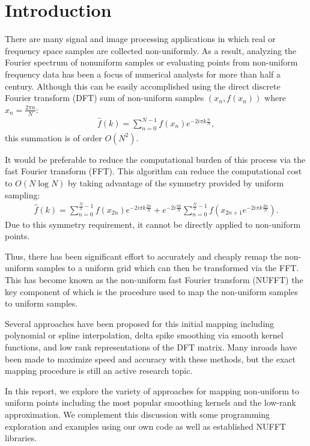


\section{Introduction}

There are many signal and image processing applications in which real or frequency space samples are collected non-uniformly.
As a result, analyzing the Fourier spectrum of nonuniform samples or evaluating points from non-uniform frequency data has been a focus of numerical analysts for more than half a century. %
Although this can be easily accomplished using the direct discrete Fourier transform (DFT) sum of non-uniform samples $(x_n, f(x_n))$ where $x_n = \frac{2\pi n}{N}$:
\begin{align*}
  \hat{f}(k) = \sum_{n=0}^{N-1} f(x_n) e^{-2i \pi k \frac{n}{N}}
,\end{align*}
this summation is of order $O(N^{2})$.

It would be preferable to reduce the computational burden of this process via the fast Fourier transform (FFT).
This algorithm can reduce the computational cost to $O(N\log{N})$ by taking advantage of the symmetry provided by uniform sampling:
\begin{align*}
  \hat{f}(k) = \sum_{n=0}^{\frac{N}{2}-1} f(x_{2n})e^{-2i \pi k \frac{2n}{N}} + e^{-2i\frac{\pi k}{N}} \sum_{n=0}^{\frac{N}{2}-1} f(x_{2n+1}e^{-2i \pi k \frac{2n}{N}})
.\end{align*}
Due to this symmetry requirement, it cannot be directly applied to non-uniform points.

Thus, there has been significant effort to accurately and cheaply remap the non-uniform samples to a uniform grid which can then be transformed via the FFT.
This has become known as the non-uniform fast Fourier transform (NUFFT) the key component of which is the procedure used to map the non-uniform samples to uniform samples.

Several approaches have been proposed for this initial mapping including polynomial or spline interpolation, delta spike smoothing via smooth kernel functions, and low rank representations of the DFT matrix. %
Many inroads have been made to maximize speed and accuracy with these methods, but the exact mapping procedure is still an active research topic.

In this report, we explore the variety of approaches for mapping non-uniform to uniform points including the most popular smoothing kernels and the low-rank approximation.
We complement this discussion with some programming exploration and examples using our own code as well as established NUFFT libraries.
